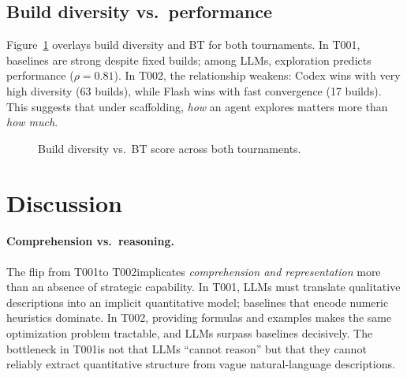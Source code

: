 \documentclass[11pt]{article}
\newcommand{\tOne}{T001}
\newcommand{\tTwo}{T002}
\begin{document}
\subsection{Build diversity vs.\ performance}

Figure~\ref{fig:diversity_scatter} overlays build diversity and BT for both tournaments.
In \tOne, baselines are strong despite fixed builds; among LLMs, exploration predicts performance ($\rho=0.81$).
In \tTwo, the relationship weakens: Codex wins with very high diversity (63 builds), while Flash wins with fast convergence (17 builds).
This suggests that under scaffolding, \emph{how} an agent explores matters more than \emph{how much}.

\begin{figure}[t]
\centering
{}
\caption{Build diversity vs.\ BT score across both tournaments.}
\label{fig:diversity_scatter}
\end{figure}

\section{Discussion}

\paragraph{Comprehension vs.\ reasoning.}
The flip from \tOne to \tTwo implicates \emph{comprehension and representation} more than an absence of strategic capability.
In \tOne, LLMs must translate qualitative descriptions into an implicit quantitative model; baselines that encode numeric heuristics dominate.
In \tTwo, providing formulas and examples makes the same optimization problem tractable, and LLMs surpass baselines decisively.
The bottleneck in \tOne is not that LLMs ``cannot reason'' but that they cannot reliably extract quantitative structure from vague natural-language descriptions.
\end{document}
